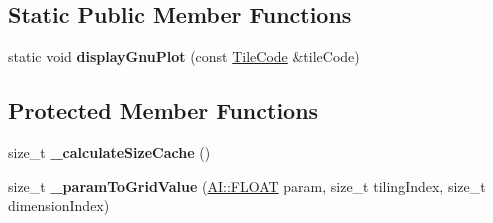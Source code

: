 \subsection*{Static Public Member Functions}
\begin{DoxyCompactItemize}
\item 
\hypertarget{classAI_1_1Algorithm_1_1TileCode_a420013442ffda741bba8a94fc4b09407}{static void {\bfseries display\-Gnu\-Plot} (const \hyperlink{classAI_1_1Algorithm_1_1TileCode}{Tile\-Code} \&tile\-Code)}\label{classAI_1_1Algorithm_1_1TileCode_a420013442ffda741bba8a94fc4b09407}

\end{DoxyCompactItemize}
\subsection*{Protected Member Functions}
\begin{DoxyCompactItemize}
\item 
\hypertarget{classAI_1_1Algorithm_1_1TileCode_a918fe826ad83e42c65bce7abfa35ad58}{size\-\_\-t {\bfseries \-\_\-calculate\-Size\-Cache} ()}\label{classAI_1_1Algorithm_1_1TileCode_a918fe826ad83e42c65bce7abfa35ad58}

\item 
\hypertarget{classAI_1_1Algorithm_1_1TileCode_a89e1188441fe9f07b4f9fa6394003a89}{size\-\_\-t {\bfseries \-\_\-param\-To\-Grid\-Value} (\hyperlink{namespaceAI_a41b74884a20833db653dded3918e05c3}{A\-I\-::\-F\-L\-O\-A\-T} param, size\-\_\-t tiling\-Index, size\-\_\-t dimension\-Index)}\label{classAI_1_1Algorithm_1_1TileCode_a89e1188441fe9f07b4f9fa6394003a89}

\end{DoxyCompactItemize}
